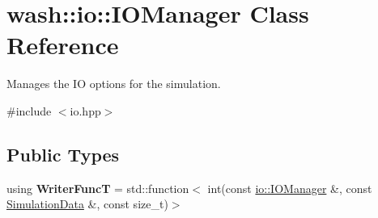 \hypertarget{classwash_1_1io_1_1IOManager}{}\section{wash\+:\+:io\+:\+:I\+O\+Manager Class Reference}
\label{classwash_1_1io_1_1IOManager}


Manages the IO options for the simulation.  




{\ttfamily \#include $<$io.\+hpp$>$}

\subsection*{Public Types}
\begin{DoxyCompactItemize}
\item 
\mbox{\label{classwash_1_1io_1_1IOManager_aeda8c39a8e3c748efd1b3e0f8ae823ee}} 
using {\bfseries Writer\+FuncT} = std\+::function$<$ int(const \mbox{\hyperlink{classwash_1_1io_1_1IOManager}{io\+::\+I\+O\+Manager}} \&, const \mbox{\hyperlink{structwash_1_1io_1_1SimulationData}{Simulation\+Data}} \&, const size\+\_\+t)$>$
\end{DoxyCompactItemize}
